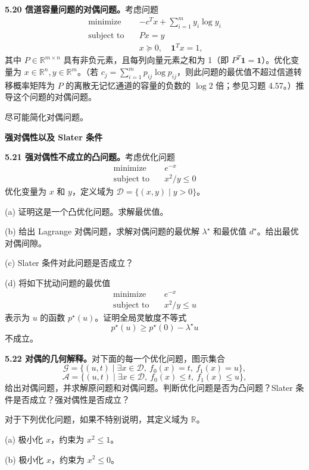 \documentclass[UTF8,12pt,a4paper,fontset=fandol]{ctexart}
\begin{document}
\noindent\textbf{5.20 信道容量问题的对偶问题。}\quad 考虑问题
\[
\begin{aligned}
\text{minimize}\quad & -c^Tx+\sum_{i=1}^m y_i\log y_i\\
\text{subject to}\quad & Px=y\\
& x\succeq 0,\quad \mathbf{1}^Tx=1,
\end{aligned}
\]
其中 $P\in\mathbb{R}^{m\times n}$ 具有非负元素，且每列向量元素之和为 1（即 $P^T\mathbf{1}=\mathbf{1}$）。优化变量为 $x\in\mathbb{R}^n, y\in\mathbb{R}^m$。（若 $c_j=\sum_{i=1}^m p_{ij}\log p_{ij}$，则此问题的最优值不超过信道转移概率矩阵为 $P$ 的离散无记忆通道的容量的负数的 $\log 2$ 倍；参见习题 4.57。）推导这个问题的对偶问题。

尽可能简化对偶问题。

\noindent\textbf{强对偶性以及 Slater 条件}

\noindent\textbf{5.21 强对偶性不成立的凸问题。}\quad 考虑优化问题
\[
\begin{aligned}
\text{minimize}\quad & e^{-x}\\
\text{subject to}\quad & x^2/y\leq 0
\end{aligned}
\]
优化变量为 $x$ 和 $y$，定义域为 $\mathcal{D}=\{(x,y)\mid y>0\}$。

(a) 证明这是一个凸优化问题。求解最优值。

(b) 给出 Lagrange 对偶问题，求解对偶问题的最优解 $\lambda^\star$ 和最优值 $d^\star$。给出最优对偶间隙。

(c) Slater 条件对此问题是否成立？

(d) 将如下扰动问题的最优值
\[
\begin{aligned}
\text{minimize}\quad & e^{-x}\\
\text{subject to}\quad & x^2/y\leq u
\end{aligned}
\]
表示为 $u$ 的函数 $p^\star(u)$。证明全局灵敏度不等式
\[
p^\star(u)\geq p^\star(0)-\lambda^\star u
\]
不成立。

\noindent\textbf{5.22 对偶的几何解释。}\quad 对下面的每一个优化问题，图示集合
\[
\mathcal{G}=\{(u,t)\mid \exists x\in\mathcal{D},\ f_0(x)=t,\ f_1(x)=u\},
\]
\[
\mathcal{A}=\{(u,t)\mid \exists x\in\mathcal{D},\ f_0(x)\leq t,\ f_1(x)\leq u\},
\]
给出对偶问题，并求解原问题和对偶问题。判断优化问题是否为凸问题？Slater 条件是否成立？强对偶性是否成立？

对于下列优化问题，如果不特别说明，其定义域为 $\mathbb{R}$。

(a) 极小化 $x$，约束为 $x^2\leq 1$。

(b) 极小化 $x$，约束为 $x^2\leq 0$。
\end{document}
